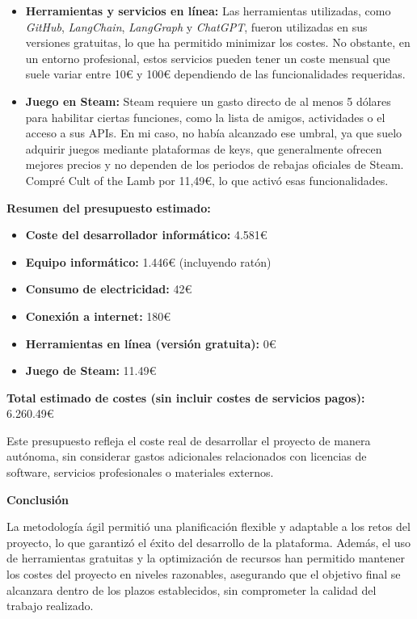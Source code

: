\begin{itemize}
    \item \textbf{Herramientas y servicios en línea:} Las herramientas utilizadas, como \textit{GitHub}, \textit{LangChain}, \textit{LangGraph} y \textit{ChatGPT}, fueron utilizadas en sus versiones gratuitas, lo que ha permitido minimizar los costes. No obstante, en un entorno profesional, estos servicios pueden tener un coste mensual que suele variar entre 10€ y 100€ dependiendo de las funcionalidades requeridas.

    \item \textbf{Juego en Steam:} Steam requiere un gasto directo de al menos 5 dólares para habilitar ciertas funciones, como la lista de amigos, actividades o el acceso a sus APIs. En mi caso, no había alcanzado ese umbral, ya que suelo adquirir juegos mediante plataformas de keys, que generalmente ofrecen mejores precios y no dependen de los periodos de rebajas oficiales de Steam. Compré Cult of the Lamb por 11,49€, lo que activó esas funcionalidades.
    
\end{itemize}

\textbf{Resumen del presupuesto estimado:}

\begin{itemize}
    \item \textbf{Coste del desarrollador informático:} 4.581€
    \item \textbf{Equipo informático:} 1.446€ (incluyendo ratón)
    \item \textbf{Consumo de electricidad:} 42€
    \item \textbf{Conexión a internet:} 180€
    \item \textbf{Herramientas en línea (versión gratuita):} 0€
    \item \textbf{Juego de Steam:} 11.49€
\end{itemize}

\textbf{Total estimado de costes (sin incluir costes de servicios pagos):} 6.260.49€

Este presupuesto refleja el coste real de desarrollar el proyecto de manera autónoma, sin considerar gastos adicionales relacionados con licencias de software, servicios profesionales o materiales externos.

\textbf{Conclusión}


La metodología ágil permitió una planificación flexible y adaptable a los retos del proyecto, lo que garantizó el éxito del desarrollo de la plataforma. Además, el uso de herramientas gratuitas y la optimización de recursos han permitido mantener los costes del proyecto en niveles razonables, asegurando que el objetivo final se alcanzara dentro de los plazos establecidos, sin comprometer la calidad del trabajo realizado.


